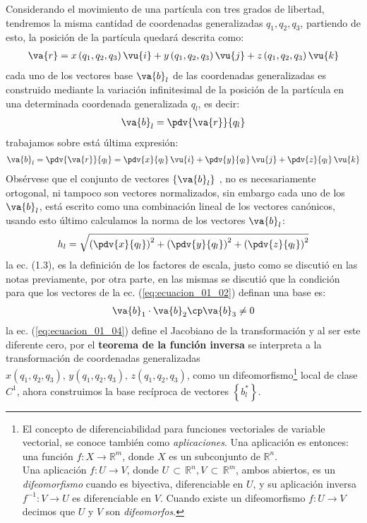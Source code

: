 Considerando el movimiento de una partícula con tres grados de libertad, tendremos la misma cantidad de coordenadas generalizadas $q_{1}, q_{2}, q_{3}$, partiendo de esto, la posición de la partícula quedará descrita como:
\begin{align}
\va{r} = x \, (q_{1}, q_{2}, q_{3}) \, \vu{i} + y \, (q_{1}, q_{2}, q_{3}) \, \vu{j} + z \, (q_{1}, q_{2}, q_{3}) \, \vu{k}
\label{eq:ecuacion_01_01}
\end{align}
cada uno de los vectores base $\va{b}_{l}$ de las coordenadas generalizadas es construido mediante la variación infinitesimal de la posición de la partícula en una determinada coordenada generalizada $q_{{l}}$, es decir:
\begin{align*}
\va{b}_{l} = \pdv{\va{r}}{q_{l}}
\end{align*}
trabajamos sobre está última expresión:
\begin{align}
\va{b}_{l} = \pdv{\va{r}}{q_{l}} = \pdv{x}{q_{l}} \, \vu{i} + \pdv{y}{q_{l}} \, \vu{j} + \pdv{z}{q_{l}} \, \vu{k}
\label{eq:ecuacion_01_02}
\end{align}
Obsérvese que el conjunto de vectores $\left\{ \va{b}_{l} \right\}$ , no es necesariamente ortogonal, ni tampoco son vectores normalizados, sin embargo cada uno de los $\va{b}_{l}$, está escrito como una combinación lineal de los vectores canónicos, usando esto último calculamos la norma de los vectores $\va{b}_{l}$:
\begin{align}
h_{l} = \sqrt{\left( \pdv{x}{q_{l}} \right)^{2} + \left( \pdv{y}{q_{l}} \right)^{2} + \left( \pdv{z}{q_{l}} \right)^{2}}
\label{eq:ecuacion_01_03}
\end{align}
la ec. (1.3), es la definición de los factores de escala, justo como se discutió en las notas previamente, por otra parte, en las mismas se discutió que la condición para que los vectores de la ec. (\ref{eq:ecuacion_01_02}) definan una base es:
\begin{align}
\va{b}_{1} \cdot \va{b}_{2} \cp \va{b}_{3} \neq 0
\label{eq:ecuacion_01_04}
\end{align}
la ec. (\ref{eq:ecuacion_01_04}) define el Jacobiano de la transformación y al ser este diferente cero, por el \textbf{teorema de la función inversa} se interpreta a la transformación de coordenadas generalizadas $x(q_{1}, q_{2}, q_{3}), \, y(q_{1}, q_{2}, q_{3}), \, z(q_{1}, q_{2}, q_{3})$, como un difeomorfismo\footnote{El concepto de diferenciabilidad para funciones vectoriales de variable vectorial, se conoce también como \emph{aplicaciones}. Una aplicación es entonces: una función $f : X \to \mathbb{R}^{m}$, donde $X$ es un subconjunto de $\mathbb{R}^{n}$. \\ Una aplicación $f : U \to V$, donde $U \, \subset \, \mathbb{R}^{n}, V \, \subset \, \mathbb{R}^{m}$, ambos abiertos, es un \emph{difeomorfismo} cuando es biyectiva, diferenciable en $U$, y su aplicación inversa $f^{-1} : V \to U$ es diferenciable en $V$. Cuando existe un difeomorfismo $f : U \to V$ decimos que $U$ y $V$ son \emph{difeomorfos}.} local de clase $C^{1}$, ahora construimos la base recíproca de vectores $\left\{ b_{l}^{*} \right\}$.
